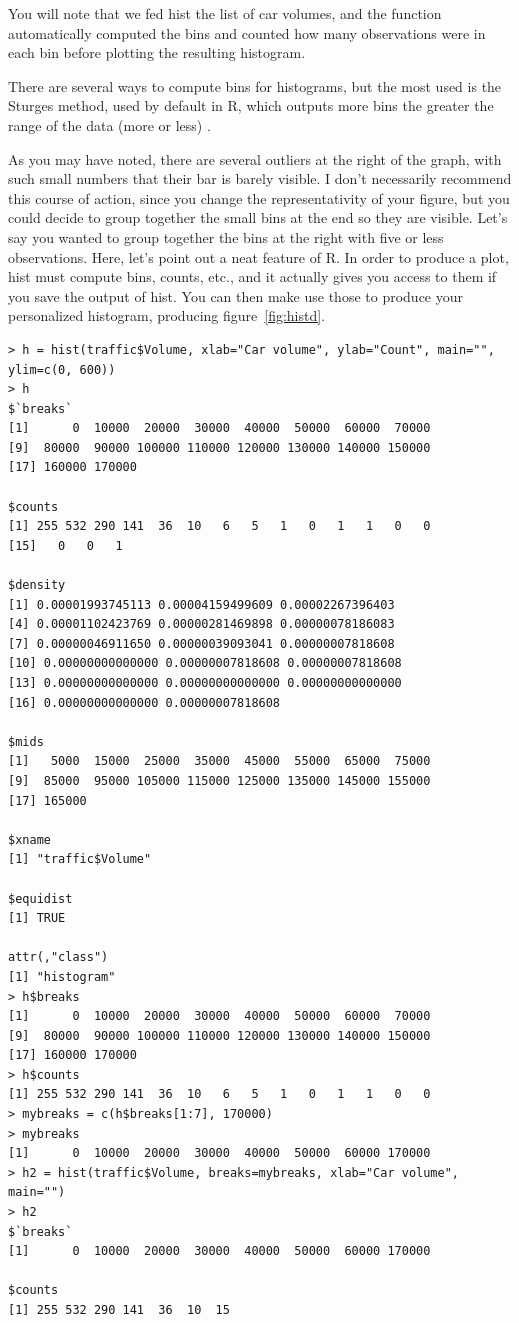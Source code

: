 \documentclass{report}
\newcommand{\code}[1]{\textsf{\ttfamily #1}}
\begin{document}
	You will note that we fed \code{hist} the list of car volumes, and the function automatically computed the bins and counted how many observations were in each bin before plotting the resulting histogram.
	
	There are several ways to compute bins for histograms, but the most used is the Sturges method, used by default in R, which outputs more bins the greater the range of the data (more or less) \cite{hist}.
	
	As you may have noted, there are several outliers at the right of the graph, with such small numbers that their bar is barely visible. I don't necessarily recommend this course of action, since you change the representativity of your figure, but you could decide to group together the small bins at the end so they are visible. Let's say you wanted to group together the bins at the right with five or less observations. Here, let's point out a neat feature of R. In order to produce a plot, \code{hist} must compute bins, counts, etc., and it actually gives you access to them if you save the output of \code{hist}. You can then make use those to produce your personalized histogram, producing figure~\ref{fig:histd}.
	\begin{verbatim}
> h = hist(traffic$Volume, xlab="Car volume", ylab="Count", main="", ylim=c(0, 600))
> h
$`breaks`
[1]      0  10000  20000  30000  40000  50000  60000  70000
[9]  80000  90000 100000 110000 120000 130000 140000 150000
[17] 160000 170000

$counts
[1] 255 532 290 141  36  10   6   5   1   0   1   1   0   0
[15]   0   0   1

$density
[1] 0.00001993745113 0.00004159499609 0.00002267396403
[4] 0.00001102423769 0.00000281469898 0.00000078186083
[7] 0.00000046911650 0.00000039093041 0.00000007818608
[10] 0.00000000000000 0.00000007818608 0.00000007818608
[13] 0.00000000000000 0.00000000000000 0.00000000000000
[16] 0.00000000000000 0.00000007818608

$mids
[1]   5000  15000  25000  35000  45000  55000  65000  75000
[9]  85000  95000 105000 115000 125000 135000 145000 155000
[17] 165000

$xname
[1] "traffic$Volume"

$equidist
[1] TRUE

attr(,"class")
[1] "histogram"
> h$breaks
[1]      0  10000  20000  30000  40000  50000  60000  70000
[9]  80000  90000 100000 110000 120000 130000 140000 150000
[17] 160000 170000
> h$counts
[1] 255 532 290 141  36  10   6   5   1   0   1   1   0   0
> mybreaks = c(h$breaks[1:7], 170000)
> mybreaks
[1]      0  10000  20000  30000  40000  50000  60000 170000
> h2 = hist(traffic$Volume, breaks=mybreaks, xlab="Car volume", main="")
> h2
$`breaks`
[1]      0  10000  20000  30000  40000  50000  60000 170000

$counts
[1] 255 532 290 141  36  10  15
	\end{verbatim}
\end{document}
